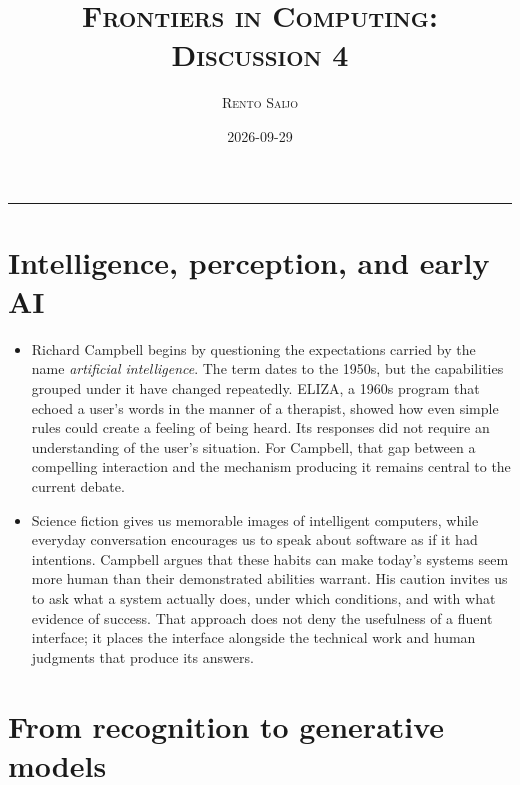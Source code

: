 \documentclass[10pt]{article}
\title{\Large\textsc{Frontiers in Computing: Discussion 4}}
\author{\large\textsc{Rento Saijo}}
\date{2026-09-29}
\begin{document}
\maketitle
\thispagestyle{fancy}
\vspace{-1em}\rule{\linewidth}{0.6pt}\vspace{0.5em}

\section*{Intelligence, perception, and early AI}

\begin{itemize}[leftmargin=1.25em, itemsep=0.3em, parsep=0pt, topsep=0pt]
    \item Richard Campbell begins by questioning the expectations carried by the name \textit{artificial intelligence}. The term dates to the 1950s, but the capabilities grouped under it have changed repeatedly. ELIZA, a 1960s program that echoed a user's words in the manner of a therapist, showed how even simple rules could create a feeling of being heard. Its responses did not require an understanding of the user's situation. For Campbell, that gap between a compelling interaction and the mechanism producing it remains central to the current debate.

    \item Science fiction gives us memorable images of intelligent computers, while everyday conversation encourages us to speak about software as if it had intentions. Campbell argues that these habits can make today's systems seem more human than their demonstrated abilities warrant. His caution invites us to ask what a system actually does, under which conditions, and with what evidence of success. That approach does not deny the usefulness of a fluent interface; it places the interface alongside the technical work and human judgments that produce its answers.
\end{itemize}

\section*{From recognition to generative models}
\end{document}
